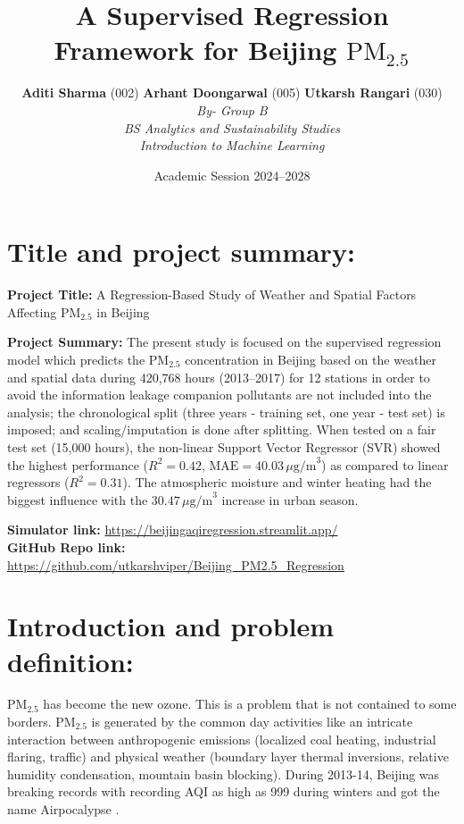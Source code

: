 \documentclass[a4paper,12pt,twocolumn]{article}
\title{\vspace{-10mm}\fontsize{15}{18}\bfseries A Supervised Regression Framework for Beijing $\text{PM}_{2.5}$}
\author{\fontsize{11}{13}\selectfont
  \textbf{Aditi Sharma} (002) \quad \textbf{Arhant Doongarwal} (005) \quad \textbf{Utkarsh Rangari} (030) \\[3pt]
  \textit{By- Group B} \\[2pt]
  \textit{BS Analytics and Sustainability Studies} \\
  \textit{Introduction to Machine Learning}
}
\date{\vspace{-2mm}\small Academic Session 2024--2028}
\begin{document}
\twocolumn[
  \begin{@twocolumnfalse}
    \maketitle
    \vspace{2mm}
  \end{@twocolumnfalse}
]

\section{Title and project summary:}
\label{sec:summary}
\noindent
\textbf{Project Title:} A Regression-Based Study of Weather and Spatial Factors Affecting $\text{PM}_{2.5}$ in Beijing

\vspace{1mm}
\noindent
\textbf{Project Summary:} 
The present study is focused on the supervised regression model which predicts the $\text{PM}_{2.5}$ concentration in Beijing based on the weather and spatial data during 420,768 hours (2013--2017) for 12 stations in order to avoid the information leakage companion pollutants are not included into the analysis; the chronological split (three years - training set, one year - test set) is imposed; and scaling/imputation is done after splitting. When tested on a fair test set (15,000 hours), the non-linear Support Vector Regressor (SVR) showed the highest performance ($R^2 = 0.42$, $\text{MAE} = 40.03\,\mu\text{g/m}^3$) as compared to linear regressors ($R^2 = 0.31$). The atmospheric moisture and winter heating had the biggest influence with the $30.47\,\mu\text{g/m}^3$ increase in urban season.

\vspace{1mm}
\noindent
\textbf{Simulator link:} \url{https://beijingaqiregression.streamlit.app/} \\
\textbf{GitHub Repo link:} \url{https://github.com/utkarshviper/Beijing_PM2.5_Regression}

\section{Introduction and problem definition:}
\label{sec:intro}
$\text{PM}_{2.5}$ has become the new ozone. This is a problem that is not contained to some borders. $\text{PM}_{2.5}$ is generated by the common day activities like an intricate interaction between anthropogenic emissions (localized coal heating, industrial flaring, traffic) and physical weather (boundary layer thermal inversions, relative humidity condensation, mountain basin blocking). During 2013-14, Beijing was breaking records with recording AQI as high as 999 during winters and got the name Airpocalypse \parencite{wiki2013smog}.
\end{document}
